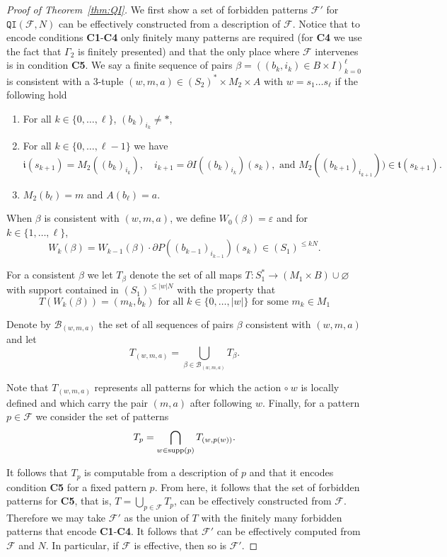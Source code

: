 \documentclass{article}
\theoremstyle{definition}
\theoremstyle{definition}
\newcommand{\FF}{\mathcal{F}}
\newcommand{\Fo}{\mathcal{F}}
\newcommand{\init}{\mathfrak{i}}
\newcommand{\ter}{\mathfrak{t}}
\newcommand{\QI}{\mathtt{QI}}
\newcommand{\supp}{\textnormal{supp}}
\begin{document}
\begin{proof}[Proof of Theorem~\ref{thm:QI}]
We first show a set of forbidden patterns $\FF'$ for $\QI(\Fo,N)$ can be effectively constructed from a description of $\Fo$. Notice that to encode conditions \textbf{C1}-\textbf{C4} only finitely many patterns are required (for \textbf{C4} we use the fact that $\Gamma_2$ is finitely presented) and that the only place where $\Fo$ intervenes is in condition \textbf{C5}. We say a finite sequence of pairs $\beta = ((b_k, i_k)\in B\times I)_{k=0}^{\ell}$ is consistent with a 3-tuple $(w,m,a)\in (S_2)^*\times M_2 \times A$ with $w = s_1 \dots s_{{\ell}}$ if the following hold
\begin{enumerate}
    \item For all $k \in \{0,\dots,{\ell}\}$, $(b_k)_{i_k}\neq \ast$,
    \item For all $k \in \{0,\dots,{\ell}-1\}$ we have \[\init(s_{k+1}) = M_2((b_{k})_{i_{k}}), \quad i_{k+1} = \partial I((b_k)_{i_k})(s_k), \mbox{ and }M_2((b_{k+1})_{i_{k+1}}))\in\ter(s_{k+1}).\]
    \item $M_2(b_{\ell}) = m$ and $A(b_{\ell})=a.$
\end{enumerate}
When $\beta$ is consistent with $(w,m,a)$, we define $W_0(\beta)=\varepsilon$ and for $k \in \{1,\dots,{\ell}\}$,
\[W_k(\beta) = W_{k-1}(\beta)\cdot \partial P((b_{k-1})_{i_{k-1}})(s_{k})\in (S_1)^{\leq kN}.\]

For a consistent $\beta$ we let $T_{\beta}$ denote the set of all maps $T \colon S_1^* \to (M_1\times B)\cup \varnothing$ with support contained in $(S_1)^{\leq |w|N}$ with the property that \[ T(W_k(\beta)) = (m_k,b_k) \mbox{ for all } k \in \{0,\dots,|w|\} \mbox{ for some } m_k \in M_1   \]

Denote by $\mathcal{B}_{(w,m,a)}$ the set of all sequences of pairs $\beta$ consistent with $(w,m,a)$ and let \[T_{(w,m,a)} = \bigcup_{\beta \in \mathcal{B}_{(w,m,a)}} T_{\beta}.\]

Note that $T_{(w,m,a)}$ represents all patterns for which the action $\circ\ w$ is locally defined and which carry the pair $(m,a)$ after following $w$. Finally, for a pattern $p\in\Fo$ we consider the set of patterns \[  T_p = \bigcap_{w \in \supp(p)}T_{(w,p(w))}.\]

It follows that $T_p$ is computable from a description of $p$ and that it encodes condition \textbf{C5} for a fixed pattern $p$. From here, it follows that the set of forbidden patterns for \textbf{C5}, that is, $T = \bigcup_{p \in \FF}T_p$, can be effectively constructed from $\Fo$. Therefore we may take $\FF'$ as the union of $T$ with the finitely many forbidden patterns that encode \textbf{C1}-\textbf{C4}. It follows that $\FF'$ can be effectively computed from $\FF$ and $N$. In particular, if $\FF$ is effective, then so is $\FF'$.


\end{proof}
\end{document}
